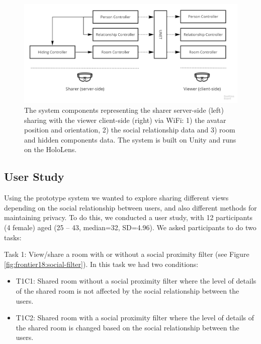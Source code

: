 \begin{figure}
\begin{center}
\includegraphics[width=\linewidth]{images/frontier18/system.jpg}
\caption{The system components representing the sharer server-side (left) sharing with the viewer client-side (right) via WiFi: 1) the avatar position and orientation, 2) the social relationship data and 3) room and hidden components data. The system is built on Unity and runs on the HoloLens.}\label{fig:frontier18:system}
\end{center}
\end{figure}

\subsection{User Study}

Using the prototype system we wanted to explore sharing different views depending on the social relationship between users, and also different methods for maintaining privacy. To do this, we conducted a user study, with 12 participants (4 female) aged (25 – 43, median=32, SD=4.96). 
We asked participants to do two tasks: 

Task 1: View/share a room with or without a social proximity filter (see Figure \ref{fig:frontier18:social-filter}). In this task we had two conditions: 

\begin{itemize}
\item T1C1: Shared room without a social proximity filter where the level of details of the shared room is not affected by the social relationship between the users.
\item T1C2: Shared room with a social proximity filter where the level of details of the shared room is changed based on the social relationship between the users. 
\end{itemize}

